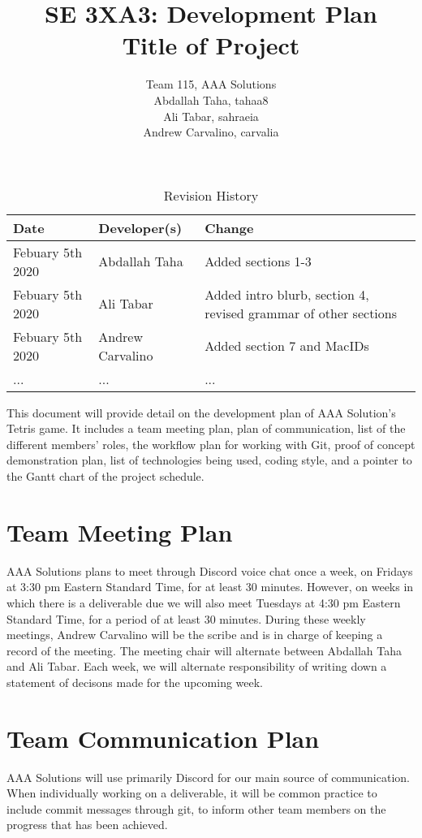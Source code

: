 \documentclass{article}
\title{SE 3XA3: Development Plan\\Title of Project}
\author{Team 115, AAA Solutions
		\\ Abdallah Taha, tahaa8
		\\ Ali Tabar, sahraeia
		\\ Andrew Carvalino, carvalia
}
\date{}
\begin{document}
\begin{table}[hp]
\caption{Revision History} \label{TblRevisionHistory}
\begin{tabularx}{\textwidth}{llX}
\toprule
\textbf{Date} & \textbf{Developer(s)} & \textbf{Change} \\
\midrule
Febuary 5th 2020 & Abdallah Taha & Added sections 1-3 \\
Febuary 5th 2020 & Ali Tabar & Added intro blurb, section 4, revised grammar of other sections \\
Febuary 5th 2020 & Andrew Carvalino & Added section 7 and MacIDs \\
... & ... & ...\\
\bottomrule
\end{tabularx}
\end{table}

\newpage

\maketitle

This document will provide detail on the development plan of AAA Solution's Tetris game. It includes a team meeting plan, plan of communication, list of the different members' roles, the workflow plan for working with Git, proof of concept demonstration plan, list of technologies being used, coding style, and a pointer to the Gantt chart of the project schedule.

\section{Team Meeting Plan}
AAA Solutions plans to meet through Discord voice chat once a week, on Fridays at 3:30 pm Eastern Standard Time, for at least 30 minutes. However, on weeks in which there is a deliverable due we will also meet Tuesdays at 4:30 pm Eastern Standard Time, for a period of at least 30 minutes. During these weekly meetings, Andrew Carvalino will be the scribe and is in charge of keeping a record of the meeting. The meeting chair will alternate between Abdallah Taha and Ali Tabar. Each week, we will alternate responsibility of writing down a statement of decisons made for the upcoming week. 

\section{Team Communication Plan}
AAA Solutions will use primarily Discord for our main source of communication. When individually working on a deliverable, it will be common practice to include commit messages through git, to inform other team members on the progress that has been achieved. 
\end{document}
